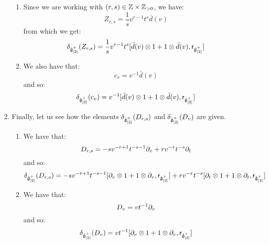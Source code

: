 \begin{remark}
\begin{enumerate}
\begin{enumerate}
                        \item Since we are working with $(r, s) \in \Z \x \Z_{> 0}$, we have:
                            $$Z_{r, s} = \frac1s v^{r - 1} t^s \bar{d}(v)$$
                        from which we get:
                            $$\delta_{\hat{\g}_{[2]}^+}(Z_{r, s}) = \frac1s v^{r - 1} t^s [\bar{d}(v) \tensor 1 + 1 \tensor \bar{d}(v), \sfr_{\hat{\g}_{[2]}^+}]$$
                        \item We also have that:
                            $$c_v = v^{-1} \bar{d}(v)$$
                        and so:
                            $$\delta_{\hat{\g}_{[2]}^+}(c_v) = v^{-1} [\bar{d}(v) \tensor 1 + 1 \tensor \bar{d}(v), \sfr_{\hat{\g}_{[2]}^+}]$$
                    \end{enumerate}
                    \item Finally, let us see how the elements $\delta_{\hat{\mathfrak{g}}_{[2]}^+}(D_{r, s})$ and $\delta_{\hat{\mathfrak{g}}_{[2]}^+}(D_v)$ are given.
                    \begin{enumerate}
                        \item We have that:
                            $$D_{r, s} = -s v^{-r + 1} t^{-s - 1} \partial_v + r v^{-r} t^{-s} \partial_t$$
                        and so:
                            $$\delta_{\hat{\g}_{[2]}^+}(D_{r, s}) = -s v^{-r + 1} t^{-s - 1} [\del_v \tensor 1 + 1 \tensor \del_v, \sfr_{\hat{\g}_{[2]}^+}] + r v^{-r} t^{-s} [\del_t \tensor 1 + 1 \tensor \del_t, \sfr_{\hat{\g}_{[2]}^+}]$$
                        \item We have that:
                            $$D_v = v t^{-1} \partial_v$$
                        and so:
                            $$\delta_{\hat{\g}_{[2]}^+}(D_v) = v t^{-1} [\del_v \tensor 1 + 1 \tensor \del_v, \sfr_{\hat{\g}_{[2]}^+}]$$
                    \end{enumerate}
                \end{enumerate}
            \end{remark}

